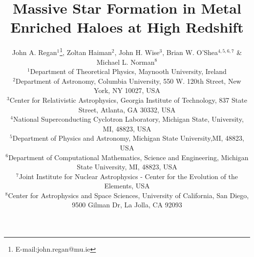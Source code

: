 \documentclass[graphics, twocolumn, usenatbib]{mn2e}
\begin{document}
\title{Massive Star Formation in Metal Enriched Haloes at High Redshift}
\author[J. A. Regan, Z. Haiman, J. H. Wise, B.W. O'Shea \&  M.L. Norman]{John A. Regan$^{1}$\thanks{E-mail:john.regan@mu.ie}, Zoltan Haiman$^{2}$,
  John H. Wise$^{3}$, Brian W. O'Shea$^{4,5,6,7}$ \newauthor \& Michael L. Norman$^8$\\
  $^1$Department of Theoretical Physics, Maynooth University, Ireland\\
  $^2$Department of Astronomy, Columbia University, 550 W. 120th Street, New York, NY 10027, USA\\
  $^3$Center for Relativistic Astrophysics, Georgia Institute of Technology, 837 State Street, Atlanta, GA 30332, USA\\
  $^4$National Superconducting Cyclotron Laboratory, Michigan State, University, MI, 48823, USA\\
  $^5$Department of Physics and Astronomy, Michigan State University,MI, 48823, USA\\
  $^6$Department of Computational Mathematics, Science and Engineering, Michigan State University, MI, 48823, USA\\    
  $^7$Joint Institute for Nuclear Astrophysics - Center for the Evolution of the Elements, USA\\
  $^8$Center for Astrophysics and Space Sciences, University of California, San Diego, 9500 Gilman Dr, La Jolla, CA 92093\\}

\label{firstpage}
\pagerange{\pageref{firstpage}--\pageref{lastpage}}
\maketitle
\end{document}
